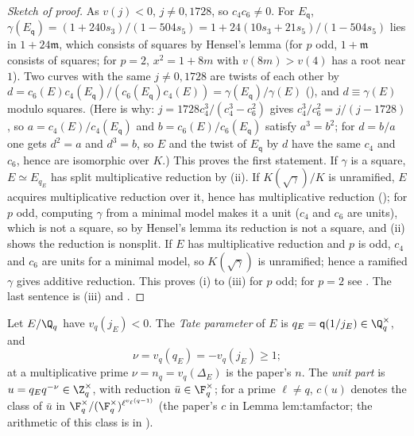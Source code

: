 \begin{proof}[Sketch of proof]
As $v(j)<0$, $j\ne0,1728$, so $c_4c_6\ne0$. For $E_{\mathsf q}$, $\gamma(E_{\mathsf q})=(1+240s_3)/(1-504s_5)=1+24(10s_3+21s_5)/(1-504s_5)$ lies in
$1+24\mathfrak m$, which consists of squares by Hensel's lemma (for $p$ odd, $1+\mathfrak m$ consists of squares; for $p=2$, $x^2=1+8m$ with
$v(8m)>v(4)$ has a root near $1$). Two curves with the same $j\ne0,1728$ are twists of each other by
$d=c_6(E)c_4(E_{\mathsf q})/(c_6(E_{\mathsf q})c_4(E))=\gamma(E_{\mathsf q})/\gamma(E)$ (), and $d\equiv\gamma(E)$ modulo squares.
(Here is why: $j=1728c_4^3/(c_4^3-c_6^2)$ gives $c_4^3/c_6^2=j/(j-1728)$, so $a=c_4(E)/c_4(E_{\mathsf q})$ and $b=c_6(E)/c_6(E_{\mathsf q})$ satisfy
$a^3=b^2$; for $d=b/a$ one gets $d^2=a$ and $d^3=b$, so $E$ and the twist of $E_{\mathsf q}$ by $d$ have the same $c_4$ and $c_6$, hence
are isomorphic over $K$.) This proves
the first statement. If $\gamma$ is a square, $E\simeq E_{q_E}$ has split multiplicative reduction by
(ii). If $K(\sqrt\gamma)/K$ is unramified, $E$ acquires multiplicative reduction over it, hence has
multiplicative reduction (); for $p$ odd, computing $\gamma$ from a minimal model makes it a unit
($c_4$ and $c_6$ are units), which is not a square, so by Hensel's lemma its reduction is not a square, and
(ii) shows the reduction is nonsplit. If $E$ has multiplicative reduction and $p$ is
odd, $c_4$ and $c_6$ are units for a minimal model, so $K(\sqrt\gamma)$ is unramified; hence a ramified $\gamma$ gives additive reduction.
This proves (i) to (iii) for $p$ odd; for $p=2$ see \cite[V.5]{SilvermanATAEC}. The last sentence is
(iii) and .
\end{proof}

\begin{definition}\label{def:reduction:tate-parameter}
Let $E/\Q_q$ have $v_q(j_E)<0$. The \emph{Tate parameter} of $E$ is $q_E=\mathsf q(1/j_E)\in\Q_q^\times$, and
\[
\nu=v_q(q_E)=-v_q(j_E)\ge1 ;
\]
at a multiplicative prime $\nu=n_q=v_q(\Delta_E)$ is the paper's $n$. The \emph{unit part} is $u=q_Eq^{-\nu}\in\Z_q^\times$, with
reduction $\bar u\in\F_q^\times$; for a prime $\ell\ne q$, $c(u)$ denotes the class of $\bar u$ in
$\F_q^\times/(\F_q^\times)^{\ell^{v_\ell(q-1)}}$ (the paper's $c$ in Lemma lem:tamfactor; the arithmetic of this class is in
).
\end{definition}

